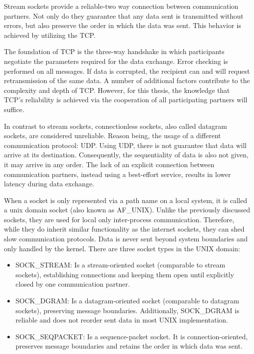 Stream sockets provide a reliable-two way connection between communication partners.
Not only do they guarantee that any data sent is transmitted without errors, but also preserve the order in which the data was sent.
This behavior is achieved by utilizing the \ac{TCP}.\cite{beej:sockets}

The foundation of \ac{TCP} is the three-way handshake in which participants negotiate the parameters required for the data exchange.
Error checking is performed on all messages.
If data is corrupted, the recipient can and will request retransmission of the same data.
A number of additional factors contribute to the complexity and depth of \ac{TCP}.
However, for this thesis, the knowledge that \ac{TCP}'s reliability is achieved via the cooperation of all participating partners will suffice.

In contrast to stream sockets, connectionless sockets, also called datagram sockets, are considered unreliable.
Reason being, the usage of a different communication protocol\@: \ac{UDP}.
Using \ac{UDP}, there is not guarantee that data will arrive at its destination.
Consequently, the sequentiality of data is also not given, it may arrive in any order.
The lack of an explicit connection between communication partners, instead using a best-effort service, results in lower latency during data exchange.\cite{beej:sockets}

When a socket is only represented via a path name on a local system, it is called a unix domain socket (also known as AF\_UNIX).
Unlike the previously discussed sockets, they are used for local only inter-process communication.
Therefore, while they do inherit similar functionality as the internet sockets, they can shed slow communication protocols.
Data is never sent beyond system boundaries and only handled by the kernel.
There are three socket types in the UNIX domain\cite{man:unixsockets}:
\begin{itemize}
    \itemsep0em
    \item SOCK\_STREAM\@: Is a stream-oriented socket (comparable to stream sockets), establishing connections and keeping them open until explicitly closed by one communication partner.
    \item SOCK\_DGRAM\@: Is a datagram-oriented socket (comparable to datagram sockets), preserving message boundaries. Additionally, SOCK\_DGRAM is reliable and does not reorder sent data in most UNIX implementation.
    \item SOCK\_SEQPACKET\@: Is a sequence-packet socket. It is connection-oriented, preserves message boundaries and retains the order in which data was sent.
\end{itemize}

